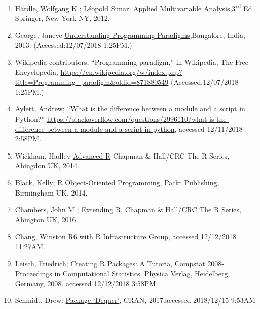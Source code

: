 \documentclass[]{book}
\theoremstyle{definition}
\theoremstyle{definition}
\theoremstyle{definition}
\theoremstyle{remark}
\begin{document}
\begin{enumerate}
\item
  Härdle, Wolfgang K ; Léopold Simar;
  \href{http://pascal.upf.edu/am/dades/h-s-mva-book/mvahtml.html}{Applied
  Multivariable Analysis},3\textsuperscript{rd} Ed., Springer, New York
  NY, 2012.
\item
  George, Janeve
  \href{http://www.janeve.me/software-programming/understanding-programming-paradigms}{Understanding
  Programming Paradigms},Bangalore, India, 2013. (Accessed:12/07/2018
  1:25PM.)
\item
  Wikipedia contributors, ``Programming paradigm,'' in Wikipedia, The
  Free Encyclopedia,
  \url{https://en.wikipedia.org/w/index.php?title=Programming_paradigm\&oldid=871880549}
  (Accessed:12/07/2018 1:25PM.)
\item
  Aylett, Andrew; ``What is the difference between a module and a script
  in Python?''
  \url{https://stackoverflow.com/questions/2996110/what-is-the-difference-between-a-module-and-a-script-in-python},
  accessed 12/11/2018 2:58PM.
\item
  Wickham, Hadley 
  \href{https://adv-r.hadley.nz/index.html}{Advanced R} Chapman \&
  Hall/CRC The R Series, Abingdon UK, 2014.
\item
  Black, Kelly;
  \href{https://smile.amazon.com/R-Object-oriented-Programming-Kelly-Black-ebook/dp/B00OYTCJQG/ref=sr_1_1?ie=UTF8\&qid=1544629643\&sr=8-1\&keywords=Packt+R+Object-Oriented}{R
  Object-Oriented Programming}, Packt Publishing, Birmingham UK, 2014.
\item
  Chambers, John M ;
  \href{https://smile.amazon.com/Extending-Chapman-Hall-John-Chambers-ebook/dp/B01GRHCLG0/ref=mt_kindle?_encoding=UTF8\&me=\&qid=1544629533}{Extending
  R}, Chapman \& Hall/CRC The R Series, Abington UK, 2016.
\item
  Chang, Winston  \href{https://r6.r-lib.org/}{R6}
  with \href{https://github.com/r-lib}{R Infrastructure Group}, accessed
  12/12/2018 11:27AM.
\item
  Leisch, Friedrich;
  \href{https://cran.r-project.org/doc/contrib/Leisch-CreatingPackages.pdf}{Creating
  R Packages: A Tutoria}, Compstat 2008-Proceedings in Computational
  Statistics. Physica Verlag, Heidelberg, Germany, 2008. accessed
  12/12/2018 3:58PM
\item
  Schmidt, Drew:
  \href{https://cran.r-project.org/web/packages/dequer/dequer.pdf}{Package
  `Dequer'}, CRAN, 2017.accessed 2018/12/15 9:53AM 

\end{enumerate}
\end{document}

